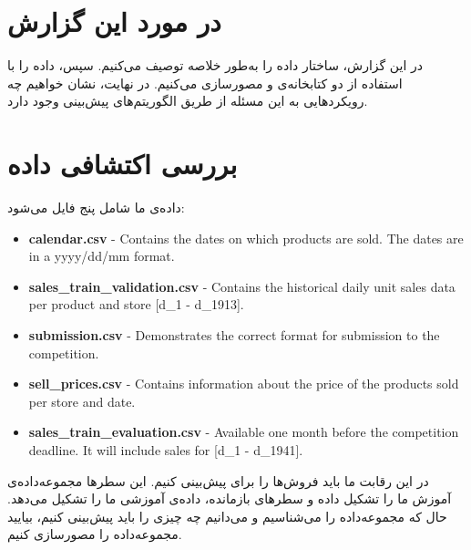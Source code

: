 \documentclass{article}
\begin{document}
\section{در مورد این گزارش}
در این گزارش، ساختار داده را به‌طور خلاصه توصیف می‌کنیم. سپس، داده را با استفاده از دو کتابخانه‌ی  و  مصورسازی می‌کنیم. در نهایت، نشان خواهیم چه رویکردهایی به این مسئله از طریق الگوریتم‌‌های پیش‌بینی وجود دارد. 
\section{بررسی اکتشافی داده}
داده‌ی ما شامل پنج فایل می‌شود:
\begin{flushleft}
\begin{latin}
\begin{itemize}
\item
\textbf{calendar.csv} - Contains the dates on which products are sold. The dates are in a yyyy/dd/mm format.
\item
\textbf{sales\_train\_validation.csv} - Contains the historical daily unit sales data per product and store [d\_1 - d\_1913].
\item
\textbf{submission.csv} - Demonstrates the correct format for submission to the competition.
\item
\textbf{sell\_prices.csv} - Contains information about the price of the products sold per store and date.
\item
\textbf{sales\_train\_evaluation.csv} - Available one month before the competition deadline. It will include sales for [d\_1 - d\_1941].
\end{itemize}
\end{latin}
\end{flushleft}
در این رقابت ما باید فروش‌ها را برای \lr{[d\_1942 - d\_1969]} پیش‌بینی کنیم. این سطر‌ها مجموعه‌داده‌ی آموزش ما را تشکیل داده و سطرهای بازمانده، داده‌ی آموزشی ما را تشکیل می‌دهد. حال که مجموعه‌داده را می‌شناسیم و می‌دانیم چه چیزی را باید پیش‌بینی کنیم، بیایید مجموعه‌داده را مصورسازی کنیم.
\end{document}
